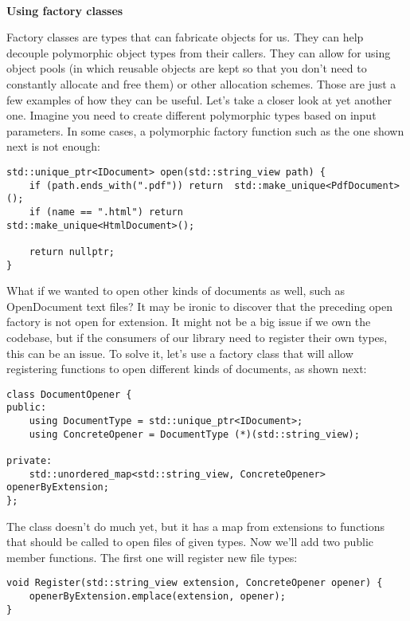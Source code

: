 \hspace*{\fill} \\ %
\noindent
\textbf{Using factory classes}

Factory classes are types that can fabricate objects for us. They can help decouple polymorphic object types from their callers. They can allow for using object pools (in which reusable objects are kept so that you don't need to constantly allocate and free them) or other allocation schemes. Those are just a few examples of how they can be useful. Let's take a closer look at yet another one. Imagine you need to create different polymorphic types based on input parameters. In some cases, a polymorphic factory function such as the one shown next is not enough:

\begin{lstlisting}[style=styleCXX]
std::unique_ptr<IDocument> open(std::string_view path) {
	if (path.ends_with(".pdf")) return 	std::make_unique<PdfDocument>();
	if (name == ".html") return 			std::make_unique<HtmlDocument>();
	
	return nullptr;
}
\end{lstlisting}

What if we wanted to open other kinds of documents as well, such as OpenDocument text files? It may be ironic to discover that the preceding open factory is not open for extension. It might not be a big issue if we own the codebase, but if the consumers of our library need to register their own types, this can be an issue. To solve it, let's use a factory class that will allow registering functions to open different kinds of documents, as shown next:

\begin{lstlisting}[style=styleCXX]
class DocumentOpener {
public:
	using DocumentType = std::unique_ptr<IDocument>;
	using ConcreteOpener = DocumentType (*)(std::string_view);

private:
	std::unordered_map<std::string_view, ConcreteOpener> openerByExtension;
};
\end{lstlisting}

The class doesn't do much yet, but it has a map from extensions to functions that should be called to open files of given types. Now we'll add two public member functions. The first one will register new file types:

\begin{lstlisting}[style=styleCXX]
void Register(std::string_view extension, ConcreteOpener opener) {
	openerByExtension.emplace(extension, opener);
}
\end{lstlisting}

